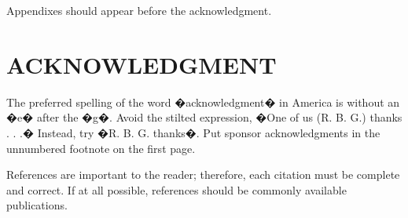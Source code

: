 \documentclass[letterpaper, 10 pt, conference]{ieeeconf}  %
\begin{document}
Appendixes should appear before the acknowledgment.

\section*{ACKNOWLEDGMENT}

The preferred spelling of the word �acknowledgment� in America is without an �e� after the �g�. Avoid the stilted expression, �One of us (R. B. G.) thanks . . .�  Instead, try �R. B. G. thanks�. Put sponsor acknowledgments in the unnumbered footnote on the first page.




References are important to the reader; therefore, each citation must be complete and correct. If at all possible, references should be commonly available publications.
\end{document}
